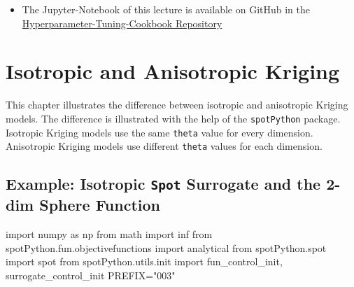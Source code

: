 \documentclass[
  letterpaper,
  DIV=11,
  numbers=noendperiod]{scrreprt}
\newenvironment{Shaded}{\begin{snugshade}}{\end{snugshade}}
\newcommand{\ImportTok}[1]{\textcolor[rgb]{0.00,0.46,0.62}{#1}}
\newcommand{\NormalTok}[1]{\textcolor[rgb]{0.00,0.23,0.31}{#1}}
\newcommand{\OperatorTok}[1]{\textcolor[rgb]{0.37,0.37,0.37}{#1}}
\newcommand{\StringTok}[1]{\textcolor[rgb]{0.13,0.47,0.30}{#1}}
\providecommand{\tightlist}{%
  \setlength{\itemsep}{0pt}\setlength{\parskip}{0pt}}\usepackage{longtable,booktabs,array}
\begin{document}
\begin{tcolorbox}[enhanced jigsaw, rightrule=.15mm, coltitle=black, title=\textcolor{quarto-callout-note-color}{\faInfo}\hspace{0.5em}{Note}, opacitybacktitle=0.6, bottomrule=.15mm, opacityback=0, left=2mm, colback=white, leftrule=.75mm, colframe=quarto-callout-note-color-frame, colbacktitle=quarto-callout-note-color!10!white, toprule=.15mm, toptitle=1mm, bottomtitle=1mm, titlerule=0mm, breakable, arc=.35mm]

\begin{itemize}
\tightlist
\item
  The Jupyter-Notebook of this lecture is available on GitHub in the
  \href{https://github.com/sequential-parameter-optimization/Hyperparameter-Tuning-Cookbook/blob/main/008_num_spot_multidim.ipynb}{Hyperparameter-Tuning-Cookbook
  Repository}
\end{itemize}

\end{tcolorbox}

\chapter{Isotropic and Anisotropic Kriging}\label{sec-iso-aniso-kriging}

This chapter illustrates the difference between isotropic and
anisotropic Kriging models. The difference is illustrated with the help
of the \texttt{spotPython} package. Isotropic Kriging models use the
same \texttt{theta} value for every dimension. Anisotropic Kriging
models use different \texttt{theta} values for each dimension.

\section{\texorpdfstring{Example: Isotropic \texttt{Spot} Surrogate and
the 2-dim Sphere
Function}{Example: Isotropic Spot Surrogate and the 2-dim Sphere Function}}\label{sec-spot-2d-sphere-iso}

\begin{Shaded}
\begin{Highlighting}[]
\ImportTok{import}\NormalTok{ numpy }\ImportTok{as}\NormalTok{ np}
\ImportTok{from}\NormalTok{ math }\ImportTok{import}\NormalTok{ inf}
\ImportTok{from}\NormalTok{ spotPython.fun.objectivefunctions }\ImportTok{import}\NormalTok{ analytical}
\ImportTok{from}\NormalTok{ spotPython.spot }\ImportTok{import}\NormalTok{ spot}
\ImportTok{from}\NormalTok{ spotPython.utils.init }\ImportTok{import}\NormalTok{ fun\_control\_init, surrogate\_control\_init}
\NormalTok{PREFIX}\OperatorTok{=}\StringTok{"003"}
\end{Highlighting}
\end{Shaded}
\end{document}
